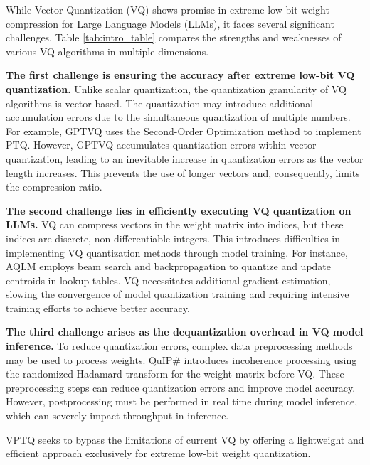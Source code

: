 While Vector Quantization (VQ) shows promise in extreme low-bit weight compression for Large Language Models (LLMs), it faces several significant challenges. Table \ref{tab:intro_table} compares the strengths and weaknesses of various VQ algorithms in multiple dimensions.


\textbf{The first challenge is ensuring the accuracy after extreme low-bit VQ quantization. }
Unlike scalar quantization, the quantization granularity of VQ algorithms is vector-based. 
The quantization may introduce additional accumulation errors due to the simultaneous quantization of multiple numbers. 
For example, GPTVQ \citep{GPTVQ} uses the Second-Order Optimization method to implement PTQ. 
However, GPTVQ accumulates quantization errors within vector quantization, leading to an inevitable increase in quantization errors as the vector length increases. This prevents the use of longer vectors and, consequently, limits the compression ratio.

\textbf{The second challenge lies in efficiently executing VQ quantization on LLMs.} 
VQ can compress vectors in the weight matrix into indices, but these indices are discrete, non-differentiable integers. This introduces difficulties in implementing VQ quantization methods through model training. For instance, AQLM \citep{AQLM} employs beam search and backpropagation to quantize and update centroids in lookup tables. VQ necessitates additional gradient estimation, slowing the convergence of model quantization training and requiring intensive training efforts to achieve better accuracy.

\textbf{The third challenge arises as the dequantization overhead in VQ model inference.}
To reduce quantization errors, complex data preprocessing methods may be used to process weights. 
QuIP\# \citep{QuIPsharp} introduces incoherence processing using the randomized Hadamard transform for the weight matrix before VQ. 
These preprocessing steps can reduce quantization errors and improve model accuracy. 
However, postprocessing must be performed in real time during model inference, which can severely impact throughput in inference.


VPTQ seeks to bypass the limitations of current VQ by offering a lightweight and efficient approach exclusively for extreme low-bit weight quantization.

